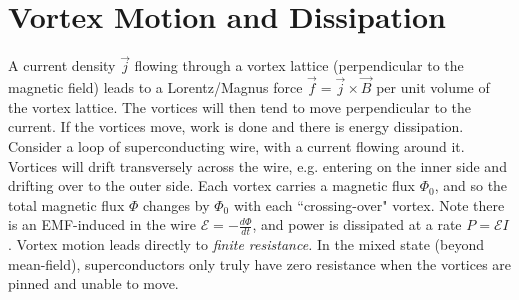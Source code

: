\documentclass[qo.tex]{subfiles}
\begin{document}
\section{Vortex Motion and Dissipation}
A current density $\vec{j}$ flowing through a vortex lattice (perpendicular to the magnetic field) leads to a Lorentz/Magnus force $\vec{f}=\vec{j}\times\vec{B}$ per unit volume of the vortex lattice.
The vortices will then tend to move perpendicular to the current. 
If the vortices move, work is done and there is energy dissipation. 
Consider a loop of superconducting wire, with a current flowing around it. 
Vortices will drift transversely across the wire, e.g. entering on the inner side and drifting over to the outer side. 
Each vortex carries a magnetic flux $\Phi_0$, and so the total magnetic flux $\Phi$ changes by $\Phi_0$ with each ``crossing-over" vortex.
Note there is an EMF-induced in the wire $\mathcal{E}=-\frac{d\Phi}{dt}$, and power is dissipated at a rate $P=\mathcal{E}I$.
Vortex motion leads directly to \emph{finite resistance.}
In the mixed state (beyond mean-field), superconductors only truly have zero resistance when the vortices are pinned and unable to move.
\end{document}
